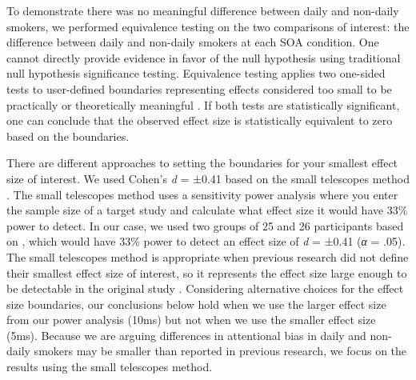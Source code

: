 \documentclass[empirical, authordate, issue]{jote-new-article}
\begin{document}
To demonstrate there was no meaningful difference between daily and non-daily smokers, we performed equivalence testing on the two comparisons of interest: the difference between daily and non-daily smokers at each SOA condition. One cannot directly provide evidence in favor of the null hypothesis using traditional null hypothesis significance testing. Equivalence testing applies two one-sided tests to user-defined boundaries representing effects considered too small to be practically or theoretically meaningful \parencite{Lakens2018}. If both tests are statistically significant, one can conclude that the observed effect size is statistically equivalent to zero based on the boundaries.

There are different approaches to setting the boundaries for your smallest effect size of interest. We used Cohen's \emph{d} = ±0.41 based on the small telescopes method \parencite{Lakens2018}. The small telescopes method uses a sensitivity power analysis where you enter the sample size of a target study and calculate what effect size it would have 33\% power to detect. In our case, we used two groups of 25 and 26 participants based on \textcite{Vollstädt-Klein2011}, which would have 33\% power to detect an effect size of \emph{d} = ±0.41 (\emph{α} = .05). The small telescopes method is appropriate when previous research did not define their smallest effect size of interest, so it represents the effect size large enough to be detectable in the original study \parencite{Simonsohn2015}. Considering alternative choices for the effect size boundaries, our conclusions below hold when we use the larger effect size from our power analysis (10ms) but not when we use the smaller effect size (5ms). Because we are arguing differences in attentional bias in daily and non-daily smokers may be smaller than reported in previous research, we focus on the results using the small telescopes method.
\end{document}

